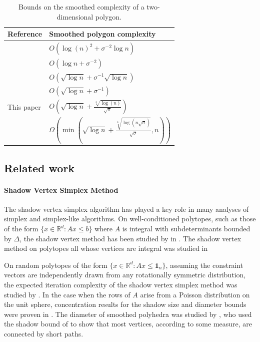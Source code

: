 \documentclass{article}\usepackage[a4paper,margin=20mm]{geometry}
\newcommand{\R}{\mathbb R}
\begin{document}
\begin{table}[h!]
  \begin{center}
  \renewcommand{\arraystretch}{1.6}
    \begin{tabular}{|l|l|}
        \hline
        {\bf Reference} & {\bf Smoothed polygon complexity} \\
        \hline
        \cite{damerow2004extreme} & $O(\log(n)^2 + \sigma^{-2}\log n)$ \\
        \hline
        \cite{thesis/Schnalzger14} & $O(\log n + \sigma^{-2})$ \\
        \hline
        \cite{DGGT16} & $O(\sqrt{\log n} + \sigma^{-1}\sqrt{\log n})$ \\
        \hline
        \cite{bwcachapter} & $O(\sqrt{\log n} + \sigma^{-1})$ \\
        \hline
        This paper & $O(\sqrt{\log n} + \frac{\sqrt[4]{\log (n)}}{\sqrt{\sigma}})$ \\
        \hline
        \hline
        \cite{DGGT16} & $\Omega(\min(\sqrt{\log n} + \frac{\sqrt[4]{\log (n\sqrt\sigma)}}{\sqrt{\sigma}},n))$ \\
        \hline
    \end{tabular}
    \caption{Bounds on the smoothed complexity of a two-dimensional polygon.}\label{tab:twod_history}
  \end{center}
\end{table}

\subsection{Related work}
\paragraph{Shadow Vertex Simplex Method}

The shadow vertex simplex algorithm has played a key role in many analyses of simplex and simplex-like algorithms.
On well-conditioned polytopes, such as those of the form $\{x \in \R^d : Ax \leq b\}$ where $A$
is integral with subdeterminants bounded by $\Delta$, the shadow vertex method has been studied
by in \cite{conf/icalp/BR13, jour/dcg/DH16}.
The shadow vertex method on polytopes all whose vertices are integral was studied in \cite{simplexzeroone,black22}

On random polytopes of the form $\{x \in \R^d : Ax \leq \mathbf 1_n\}$, assuming the
constraint vectors are independently drawn from any rotationally symmetric distribution, the
expected iteration complexity of the shadow vertex simplex method was studied by \cite{b82, b87, b99}.
In the case when the rows of $A$ arise from a Poisson distribution on the unit sphere,
concentration results for the shadow size and diameter bounds were proven in \cite{bdghl21}.
The diameter of smoothed polyhedra was studied by \cite{narayanan2021spectral}, who used the shadow bound of \cite{DH18}
to show that most vertices, according to some measure, are connected by short paths.
\end{document}
